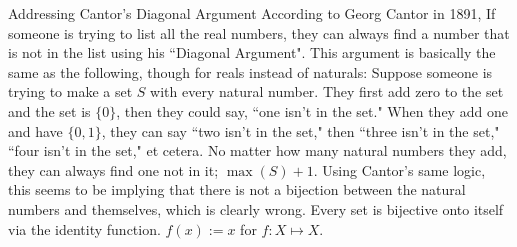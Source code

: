 \documentclass[12pt]{article}
\begin{document}
\begin{section}{Addressing Cantor's Diagonal Argument}\label{sec:diagonal argument}
	According to Georg Cantor in 1891, If someone is trying to list all the real numbers,
	they can always find a number that is not in the list using his ``Diagonal Argument".
	This argument is basically the same as the following, though for reals instead of
	naturals: Suppose someone is trying to make a set $S$ with every natural number. They first
	add zero to the set and the set is $\{0\}$, then they could say, ``one isn't in the set."
	When they add one and have $\{0,1\}$, they can say ``two isn't in the set," then ``three
	isn't in the set," ``four isn't in the set," et cetera. No matter how many natural numbers
	they add, they can always find one not in it; $\max(S)+1$. Using Cantor's same logic, this
	seems to be implying that there is not a bijection between the natural numbers and
	themselves, which is clearly wrong. Every set is bijective onto itself via the identity
	function. $f(x) := x$ for  $f:X\mapsto X$.
\end{section}
\end{document}
